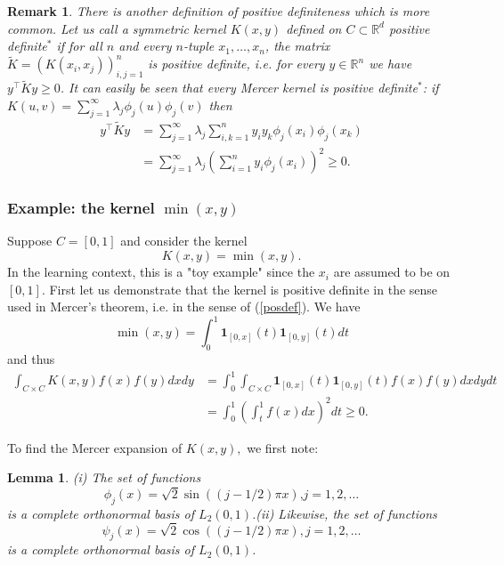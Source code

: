 \documentclass[11pt,twoside]{article}%
\theoremstyle{change}
\newtheorem{lemma}[theorem]{Lemma}
\newtheorem{remark}[theorem]{Remark}
\begin{document}
\begin{remark}
\label{rem-other-positive-definiteness-kernel}There is another definition of
positive definiteness which is more common. Let us call a symmetric kernel
$K\left(  x,y\right)  $ defined on $C\subset\mathbb{R}^{d}$ positive
definite$^{\ast}$ if for all $n$ and every $n$-tuple $x_{1},\ldots,x_{n}$, the
matrix $\tilde{K}=\left(  K\left(  x_{i},x_{j}\right)  \right)  _{i,j=1}^{n}$
is positive definite, i.e. for every $y\in\mathbb{R}^{n}$ we have $y^{\top
}\tilde{K}y\geq0$. It can easily be seen that every Mercer kernel is positive
definite$^{\ast}$: if $K(u,v)=\sum_{j=1}^{\infty}\lambda_{j}\phi_{j}%
(u)\phi_{j}(v)$ then
\begin{align*}
y^{\top}\tilde{K}y  & =\sum_{j=1}^{\infty}\lambda_{j}\sum_{i,k=1}^{n}%
y_{i}y_{k}\phi_{j}(x_{i})\phi_{j}(x_{k})\\
& =\sum_{j=1}^{\infty}\lambda_{j}\left(  \sum_{i=1}^{n}y_{i}\phi_{j}%
(x_{i})\right)  ^{2}\geq0.
\end{align*}

\end{remark}

\subsubsection{Example: the kernel $\min(x,y)$}

Suppose $C=[0,1]$ and consider the kernel
\[
K\left(  x,y\right)  =\min(x,y).
\]
In the learning context, this is a "toy example" since the $x_{i}$ are assumed
to be on $[0,1]$. First let us demonstrate that the kernel is positive
definite in the sense used in Mercer's theorem, i.e. in the sense of
(\ref{posdef}). We have
\[
\min(x,y)=\int_{0}^{1}\mathbf{1}_{[0,x]}(t)\mathbf{1}_{[0,y]}(t)dt
\]
and thus
\begin{align*}
\int_{C\times C}K(x,y)f(x)f(y)dxdy  & =\int_{0}^{1}\int_{C\times C}%
\mathbf{1}_{[0,x]}(t)\mathbf{1}_{[0,y]}(t)f(x)f(y)dxdydt\\
& =\int_{0}^{1}\left(  \int_{t}^{1}f(x)dx\right)  ^{2}dt\geq0.
\end{align*}


To find the Mercer expansion of $K\left(  x,y\right)  ,$ we first note:

\begin{lemma}
\label{lem-eigenfunc}(i) The set of functions
\[
\phi_{j}(x)=\sqrt{2}\sin\left(  \left(  j-1/2\right)  \pi x\right)  \text{,
}j=1,2,\ldots
\]
is a complete orthonormal basis of $L_{2}(0,1)$.\newline(ii) Likewise, the set
of functions
\[
\psi_{j}(x)=\sqrt{2}\cos\left(  \left(  j-1/2\right)  \pi x\right)
,j=1,2,\ldots
\]
is a complete orthonormal basis of $L_{2}(0,1)$.
\end{lemma}%
\end{document}
